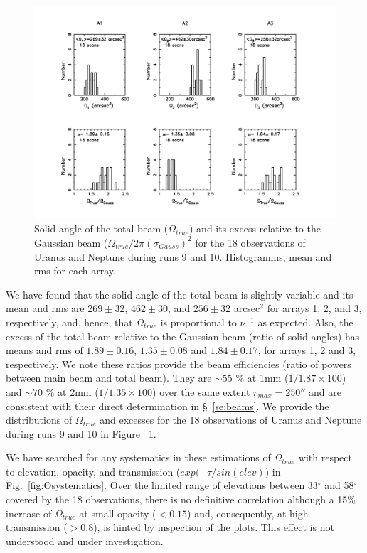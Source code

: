 \begin{figure}[h]
\begin{center}
  \includegraphics[clip, angle=0, scale=0.6]{Figures/Hist_omega_true_and_excess.pdf}
  \caption{Solid angle of the total beam ($\Omega_{true}$) and its excess relative to the Gaussian beam
   ($\Omega_{true} / 2 \pi (\sigma_{Gauss})^2$ for the 18 observations of Uranus and Neptune during runs 9 and 10.
   Histogramms, mean and rms for each array.}
\label{fig:Otrue}
\end{center}
\end{figure}

We have found that the solid angle of the total beam is slightly variable and its mean and rms are
$269\pm32$, $462\pm30$, and $256\pm32$ arcsec$^2$ for arrays 1, 2, and 3, respectively, and, hence,
that $\Omega_{true}$ is proportional to $\nu^{-1}$ as expected. Also, the excess of the total beam
relative to the Gaussian beam (ratio of solid angles) has means and rms
of $1.89\pm0.16$, $1.35\pm0.08$ and $1.84\pm0.17$, for arrays 1, 2 and 3, respectively.
We note these ratios provide
the beam efficiencies (ratio of powers between main beam  and total beam). They
are $\sim 55$ \% at 1mm ($1/1.87 \times 100$) and $\sim 70$ \% at 2mm ($1/1.35 \times 100$)
over the same extent $r_{max}=250''$ and are consistent with their direct determination in \S~\ref{se:beams}.
 We provide the  distributions of $\Omega_{true}$ and excesses for
 the 18 observations of Uranus and Neptune during runs 9 and 10 in Figure ~\ref{fig:Otrue}. 

We have searched for any systematics in these estimations of $\Omega_{true}$ with respect to elevation,
opacity,  and transmission ($exp(-\tau/sin(elev)$) in Fig.~\ref{fig:Osystematics}.
Over the limited range of elevations between  33$^{\circ}$ and 58$^{\circ}$ covered by the 18 observations,
there is no definitive correlation although
a 15\% increase of $\Omega_{true}$ at small opacity ($<0.15$) and, consequently,
at high transmission ($> 0.8$), is hinted by inspection of the plots.
This effect is not understood and under investigation. 

